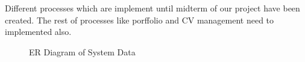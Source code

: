 Different processes which are implement until midterm of our project have been created. The rest of processes like porffolio and CV management need to implemented also.
\begin{figure}[H]
  \caption{ER Diagram of System Data}
\end{figure}
\newpage